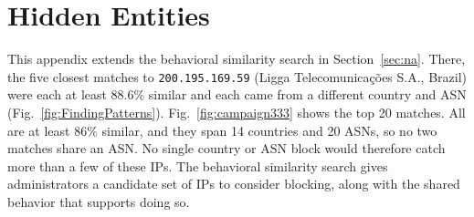 \documentclass[conference]{IEEEtran}
\newcommand{\ip}[1]{\mbox{\texttt{#1}}}
\begin{document}
\section{Hidden Entities}
\label{app:hidden}

This appendix extends the behavioral similarity search in Section~\ref{sec:na}.
There, the five closest matches to \ip{200.195.169.59} (Ligga
Telecomunica\c{c}\~{o}es S.A., Brazil) were each at least 88.6\% similar
and each came from a different country and ASN (Fig.~\ref{fig:FindingPatterns}).
Fig.~\ref{fig:campaign333} shows the top 20 matches. All are at least
86\% similar, and they span 14 countries and 20 ASNs, so no two matches
share an ASN. No single country or ASN block would therefore catch more than a few of these IPs. 
The behavioral similarity search gives
administrators a candidate set of IPs to consider blocking, along with the shared behavior that supports doing so.
\end{document}
